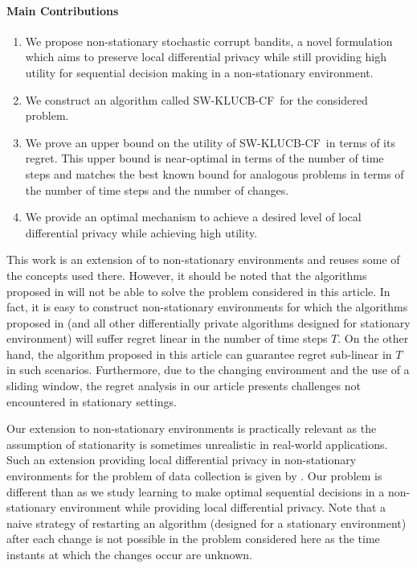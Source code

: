 \documentclass[letterpaper]{article} %
\newcommand{\SWKLUCBCF}{\textsc{SW-KLUCB-CF}}
\begin{document}
\paragraph{Main Contributions}
\begin{enumerate}
    \item We propose non-stationary stochastic corrupt bandits, a novel formulation which aims to preserve local differential privacy while still providing high utility for sequential decision making in a non-stationary environment.
    \item We construct an algorithm called \SWKLUCBCF \ for the considered problem. 
    \item We prove an upper bound on the utility of \SWKLUCBCF \ in terms of its regret. This upper bound is near-optimal in terms of the number of time steps and matches the best known bound for analogous problems in terms of the number of time steps and the number of changes.
    \item We provide an optimal mechanism to achieve a desired level of local differential privacy while achieving high utility.
\end{enumerate}

This work is an extension of \citet{pmlr-v83-gajane18a} to non-stationary environments and reuses some of the concepts used there. However, it should be noted that the algorithms proposed in \citet{pmlr-v83-gajane18a} will not be able to solve the problem considered in this article. In fact, it is easy to construct non-stationary environments for which the algorithms proposed in \citet{pmlr-v83-gajane18a} (and all other differentially private algorithms designed for stationary environment) will suffer regret linear in the number of time steps $T$. On the other hand, the algorithm proposed in this article can guarantee regret sub-linear in $T$ in such scenarios. Furthermore, due to the changing environment and the use of a sliding window, the regret analysis in our article presents challenges not encountered in stationary settings. 

Our extension to non-stationary environments is practically relevant as the assumption of stationarity is sometimes unrealistic in real-world applications. Such an extension providing local differential privacy in non-stationary environments for the problem of data collection is given by \citet{NEURIPS2018_a0161022}. %
Our problem is different than \citet{NEURIPS2018_a0161022} as we study learning to make optimal sequential decisions in a non-stationary environment while providing local differential privacy. 
%
Note that a naive strategy of restarting an algorithm (designed for a stationary environment) after each change is not possible in the problem considered here as the time instants at which the changes occur are unknown.
\end{document}
